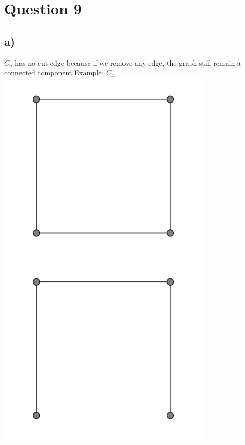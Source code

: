 \documentclass{article}
\begin{document}
\section*{Question 9}
\subsection*{a)}
$C_n$ has no cut edge because if we remove any edge, the graph still remain a connected component
Example: $C_4$
\newline
\includegraphics[]{Question 9/connectivity_9.a.png}
\includegraphics[]{Question 9/connectivity_9.a.edited.png}
\newline
\end{document}
